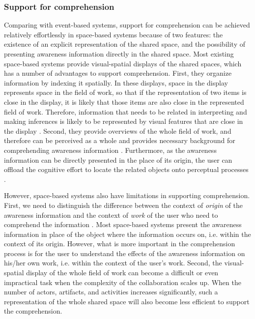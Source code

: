 \subsubsection{Support for comprehension} %
\label{ssub:support_for_comprehension}
Comparing with event-based systems, support for comprehension can be achieved relatively effortlessly in space-based systems because of two features: the existence of an explicit representation of the shared space, and the possibility of presenting awareness information directly in the shared space. Most existing space-based systems provide visual-spatial displays \cite{Hegarty2011} of the shared spaces, which has a number of advantages to support comprehension. First, they organize information by indexing it spatially. In these displays, space in the display represents space in the field of work, so that if the representation of two items is close in the display, it is likely that those items are also close in the represented field of work. Therefore, information that needs to be related in interpreting and making inferences is likely to be represented by visual features that are close in the display \cite{Hegarty2011}. Second, they provide overviews of the whole field of work, and therefore can be perceived as a whole and provides necessary background for comprehending awareness information \cite{Berlage1999}. Furthermore, as the awareness information can be directly presented in the place of its origin, the user can offload the cognitive effort to locate the related objects onto perceptual processes \cite{M.1996}.

However, space-based systems also have limitations in supporting comprehension. First, we need to distinguish the difference between the context of \emph{origin} of the awareness information and the context of \emph{work} of the user who need to comprehend the information \cite{Gross2004}. Most space-based systems present the awareness information in place of the object where the information occurs on, i.e. within the context of its origin. However, what is more important in the comprehension process is for the user to understand the effects of the awareness information on his/her own work, i.e. within the context of the user's work. Second, the visual-spatial display of the whole field of work can become a difficult or even impractical task when the complexity of the collaboration scales up. When the number of actors, artifacts, and activities increases significantly, such a representation of the whole shared space will also become less efficient to support the comprehension. 
